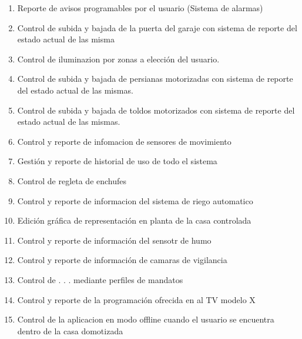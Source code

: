 \begin{enumerate}
			\item Reporte de avisos programables por el usuario (Sistema de alarmas)
			
			\item Control de subida y bajada de la puerta del garaje con sistema de reporte del estado actual de las misma
			
			\item Control de iluminazion por zonas a elecci\'on del usuario.
			
			\item Control de subida y bajada de persianas motorizadas con sistema de reporte del estado actual de las mismas. 
			
			\item Control de subida y bajada de toldos motorizados con sistema de reporte del estado actual de las mismas. 
			
			\item Control  y reporte de infomacion de sensores de movimiento
			
			\item Gesti\'on y reporte de historial de uso de todo el sistema
			
			\item Control de regleta  de enchufes
			
			\item Control y reporte de informacion del sistema de riego automatico
			
			\item Edici\'on gr\'afica de representaci\'on en planta de la casa controlada
			
			\item Control y reporte de informaci\'on del sensotr de humo
			
			\item Control y reporte de informaci\'on de camaras de vigilancia
			
			\item Control de . . . mediante perfiles de mandatos
			
			\item Control y reporte de la programaci\'on ofrecida en al TV modelo X
			
			\item Control de la aplicacion en modo offline cuando el usuario se encuentra dentro de la casa domotizada
	
	\end{enumerate}